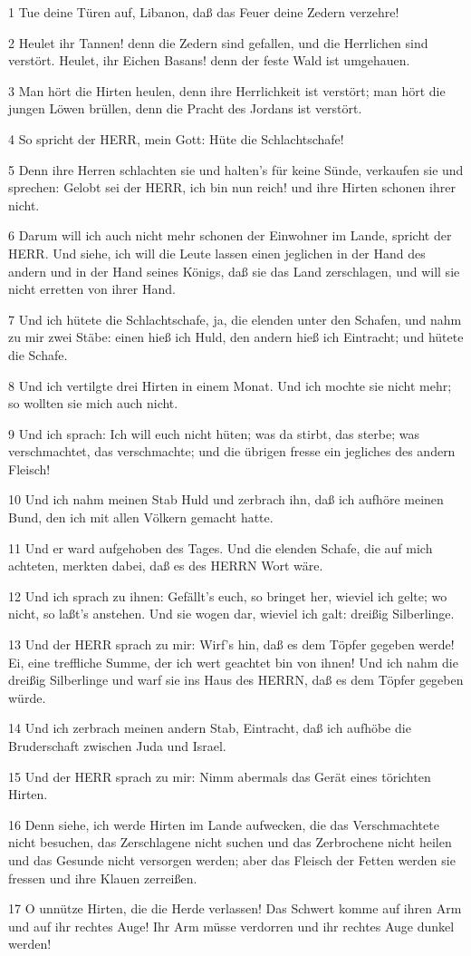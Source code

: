 \par 1 Tue deine Türen auf, Libanon, daß das Feuer deine Zedern verzehre!
\par 2 Heulet ihr Tannen! denn die Zedern sind gefallen, und die Herrlichen sind verstört. Heulet, ihr Eichen Basans! denn der feste Wald ist umgehauen.
\par 3 Man hört die Hirten heulen, denn ihre Herrlichkeit ist verstört; man hört die jungen Löwen brüllen, denn die Pracht des Jordans ist verstört.
\par 4 So spricht der HERR, mein Gott: Hüte die Schlachtschafe!
\par 5 Denn ihre Herren schlachten sie und halten's für keine Sünde, verkaufen sie und sprechen: Gelobt sei der HERR, ich bin nun reich! und ihre Hirten schonen ihrer nicht.
\par 6 Darum will ich auch nicht mehr schonen der Einwohner im Lande, spricht der HERR. Und siehe, ich will die Leute lassen einen jeglichen in der Hand des andern und in der Hand seines Königs, daß sie das Land zerschlagen, und will sie nicht erretten von ihrer Hand.
\par 7 Und ich hütete die Schlachtschafe, ja, die elenden unter den Schafen, und nahm zu mir zwei Stäbe: einen hieß ich Huld, den andern hieß ich Eintracht; und hütete die Schafe.
\par 8 Und ich vertilgte drei Hirten in einem Monat. Und ich mochte sie nicht mehr; so wollten sie mich auch nicht.
\par 9 Und ich sprach: Ich will euch nicht hüten; was da stirbt, das sterbe; was verschmachtet, das verschmachte; und die übrigen fresse ein jegliches des andern Fleisch!
\par 10 Und ich nahm meinen Stab Huld und zerbrach ihn, daß ich aufhöre meinen Bund, den ich mit allen Völkern gemacht hatte.
\par 11 Und er ward aufgehoben des Tages. Und die elenden Schafe, die auf mich achteten, merkten dabei, daß es des HERRN Wort wäre.
\par 12 Und ich sprach zu ihnen: Gefällt's euch, so bringet her, wieviel ich gelte; wo nicht, so laßt's anstehen. Und sie wogen dar, wieviel ich galt: dreißig Silberlinge.
\par 13 Und der HERR sprach zu mir: Wirf's hin, daß es dem Töpfer gegeben werde! Ei, eine treffliche Summe, der ich wert geachtet bin von ihnen! Und ich nahm die dreißig Silberlinge und warf sie ins Haus des HERRN, daß es dem Töpfer gegeben würde.
\par 14 Und ich zerbrach meinen andern Stab, Eintracht, daß ich aufhöbe die Bruderschaft zwischen Juda und Israel.
\par 15 Und der HERR sprach zu mir: Nimm abermals das Gerät eines törichten Hirten.
\par 16 Denn siehe, ich werde Hirten im Lande aufwecken, die das Verschmachtete nicht besuchen, das Zerschlagene nicht suchen und das Zerbrochene nicht heilen und das Gesunde nicht versorgen werden; aber das Fleisch der Fetten werden sie fressen und ihre Klauen zerreißen.
\par 17 O unnütze Hirten, die die Herde verlassen! Das Schwert komme auf ihren Arm und auf ihr rechtes Auge! Ihr Arm müsse verdorren und ihr rechtes Auge dunkel werden!

